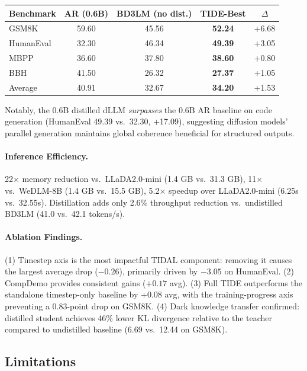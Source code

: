 \documentclass[11pt]{article}
\begin{document}
\begin{center}
\begin{tabular}{lcccc}
\toprule
\textbf{Benchmark} & \textbf{AR (0.6B)} & \textbf{BD3LM (no dist.)} & \textbf{TIDE-Best} & \textbf{$\Delta$} \\
\midrule
GSM8K & 59.60 & 45.56 & \textbf{52.24} & +6.68 \\
HumanEval & 32.30 & 46.34 & \textbf{49.39} & +3.05 \\
MBPP & 36.60 & 37.80 & \textbf{38.60} & +0.80 \\
BBH & 41.50 & 26.32 & \textbf{27.37} & +1.05 \\
Average & 40.91 & 32.67 & \textbf{34.20} & +1.53 \\
\bottomrule
\end{tabular}
\end{center}

Notably, the 0.6B distilled dLLM \emph{surpasses} the 0.6B AR baseline on code generation (HumanEval 49.39 vs.\ 32.30, +17.09), suggesting diffusion models' parallel generation maintains global coherence beneficial for structured outputs.

\paragraph{Inference Efficiency.}
22$\times$ memory reduction vs.\ LLaDA2.0-mini (1.4 GB vs.\ 31.3 GB), 11$\times$ vs.\ WeDLM-8B (1.4 GB vs.\ 15.5 GB), 5.2$\times$ speedup over LLaDA2.0-mini (6.25s vs.\ 32.55s). Distillation adds only 2.6\% throughput reduction vs.\ undistilled BD3LM (41.0 vs.\ 42.1 tokens/s).

\paragraph{Ablation Findings.}
(1) Timestep axis is the most impactful TIDAL component: removing it causes the largest average drop ($-0.26$), primarily driven by $-3.05$ on HumanEval. (2) CompDemo provides consistent gains ($+0.17$ avg). (3) Full TIDE outperforms the standalone timestep-only baseline by +0.08 avg, with the training-progress axis preventing a 0.83-point drop on GSM8K. (4) Dark knowledge transfer confirmed: distilled student achieves 46\% lower KL divergence relative to the teacher compared to undistilled baseline (6.69 vs.\ 12.44 on GSM8K).

\subsection{Limitations}
\end{document}
